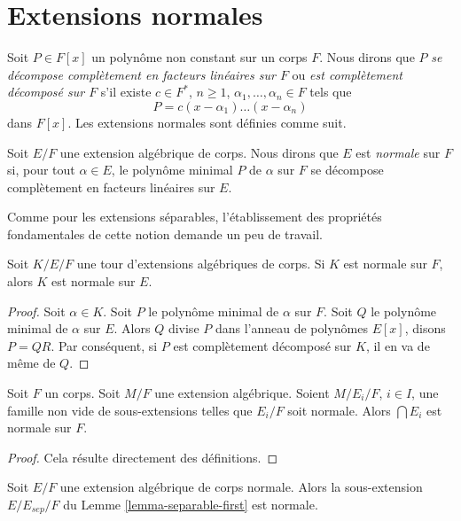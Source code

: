 \section{Extensions normales}
\label{section-normal}

\noindent
Soit $P \in F[x]$ un polynôme non constant sur un corps $F$. Nous dirons que $P$
{\it se décompose complètement en facteurs linéaires sur $F$} ou
{\it est complètement décomposé sur $F$} s'il existe
$c \in F^*$, $n \geq 1$, $\alpha_1, \ldots, \alpha_n \in F$ tels que
$$
P = c(x - \alpha_1) \ldots (x - \alpha_n)
$$
dans $F[x]$. Les extensions normales sont définies comme suit.

\begin{definition}
\label{definition-normal}
Soit $E/F$ une extension algébrique de corps. Nous dirons que $E$ est {\it normale}
sur $F$ si, pour tout $\alpha \in E$, le polynôme minimal $P$
de $\alpha$ sur $F$ se décompose complètement en facteurs linéaires sur $E$.
\end{definition}

\noindent
Comme pour les extensions séparables, l'établissement des propriétés
fondamentales de cette notion demande un peu de travail.

\begin{lemma}
\label{lemma-normal-goes-up}
Soit $K/E/F$ une tour d'extensions algébriques de corps.
Si $K$ est normale sur $F$, alors $K$ est normale sur $E$.
\end{lemma}

\begin{proof}
Soit $\alpha \in K$. Soit $P$ le polynôme minimal de $\alpha$ sur $F$.
Soit $Q$ le polynôme minimal de $\alpha$ sur $E$.
Alors $Q$ divise $P$ dans l'anneau de polynômes $E[x]$, disons $P = QR$.
Par conséquent, si $P$ est complètement décomposé sur $K$, il en va de même de $Q$.
\end{proof}

\begin{lemma}
\label{lemma-intersect-normal}
Soit $F$ un corps. Soit $M/F$ une extension algébrique. Soient
$M/E_i/F$, $i \in I$, une famille non vide de sous-extensions telles que
$E_i/F$ soit normale. Alors $\bigcap E_i$ est normale sur $F$.
\end{lemma}

\begin{proof}
Cela résulte directement des définitions.
\end{proof}

\begin{lemma}
\label{lemma-separable-first-normal}
Soit $E/F$ une extension algébrique de corps normale. Alors la sous-extension
$E/E_{sep}/F$ du Lemme \ref{lemma-separable-first} est normale.
\end{lemma}

